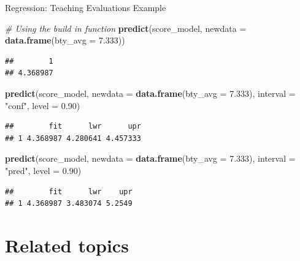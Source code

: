 \documentclass[
  ignorenonframetext,
]{beamer}
\newenvironment{Shaded}{\begin{snugshade}}{\end{snugshade}}
\newcommand{\AttributeTok}[1]{\textcolor[rgb]{0.13,0.29,0.53}{#1}}
\newcommand{\CommentTok}[1]{\textcolor[rgb]{0.56,0.35,0.01}{\textit{#1}}}
\newcommand{\FloatTok}[1]{\textcolor[rgb]{0.00,0.00,0.81}{#1}}
\newcommand{\FunctionTok}[1]{\textcolor[rgb]{0.13,0.29,0.53}{\textbf{#1}}}
\newcommand{\NormalTok}[1]{#1}
\newcommand{\StringTok}[1]{\textcolor[rgb]{0.31,0.60,0.02}{#1}}
\begin{document}
\begin{frame}[fragile]{Regression: Teaching Evaluations Example}
\protect\hypertarget{regression-teaching-evaluations-example-14}{}
\tiny

\begin{Shaded}
\begin{Highlighting}[]
\CommentTok{\# Using the build in function}
\FunctionTok{predict}\NormalTok{(score\_model, }\AttributeTok{newdata =} \FunctionTok{data.frame}\NormalTok{(}\AttributeTok{bty\_avg =} \FloatTok{7.333}\NormalTok{))}
\end{Highlighting}
\end{Shaded}

\begin{verbatim}
##        1 
## 4.368987
\end{verbatim}

\begin{Shaded}
\begin{Highlighting}[]
\FunctionTok{predict}\NormalTok{(score\_model, }\AttributeTok{newdata =} \FunctionTok{data.frame}\NormalTok{(}\AttributeTok{bty\_avg =} \FloatTok{7.333}\NormalTok{), }\AttributeTok{interval =} \StringTok{"conf"}\NormalTok{, }\AttributeTok{level =} \FloatTok{0.90}\NormalTok{)}
\end{Highlighting}
\end{Shaded}

\begin{verbatim}
##        fit      lwr      upr
## 1 4.368987 4.280641 4.457333
\end{verbatim}

\begin{Shaded}
\begin{Highlighting}[]
\FunctionTok{predict}\NormalTok{(score\_model, }\AttributeTok{newdata =} \FunctionTok{data.frame}\NormalTok{(}\AttributeTok{bty\_avg =} \FloatTok{7.333}\NormalTok{), }\AttributeTok{interval =} \StringTok{"pred"}\NormalTok{, }\AttributeTok{level =} \FloatTok{0.90}\NormalTok{)}
\end{Highlighting}
\end{Shaded}

\begin{verbatim}
##        fit      lwr    upr
## 1 4.368987 3.483074 5.2549
\end{verbatim}

\normalsize
\end{frame}

\hypertarget{related-topics}{%
\section{Related topics}\label{related-topics}}
\end{document}
